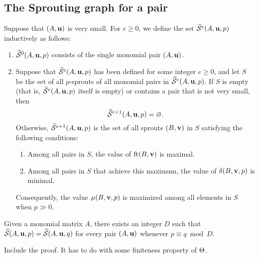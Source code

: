 \documentclass[11pt]{amsart}
\begin{document}
\subsection{The Sprouting graph for a pair}
\begin{definition}
   Suppose that $(A, \mathbf{u})$ is very small.
   For $e \geq 0$, we define the set $\widehat{\mathcal{S}}^e(A,\mathbf{u},p)$ inductively as follows:
\begin{enumerate}
\item $\widehat{\mathcal{S}}^0(A, \mathbf{u}, p)$ consists of the single monomial pair $(A, \mathbf{u})$.
\item Suppose that $\widehat{\mathcal{S}}^e(A, \mathbf{u}, p)$ has been defined for some integer $e \geq 0$, and let $S$ be the set of all $p$-sprouts of all monomial pairs in $\widehat{\mathcal{S}}^e(A, \mathbf{u}, p)$.
If  $S$ is empty (that is, $\widehat{\mathcal{S}}^e(A, \mathbf{u}, p)$ itself is empty) or contains a pair that is not very small, then \[ \widehat{\mathcal{S}}^{e+1}(A, \mathbf{u}, p) = \varnothing.\]  
Otherwise, $\widehat{\mathcal{S}}^{e+1}(A, \mathbf{u}, p)$ is the set of all sprouts $(B, \mathbf{v})$ in $S$ satisfying the following conditions:    

\begin{enumerate}
\item Among all pairs in $S$, the value of  $\operatorname{ft}(B, \mathbf{v})$ is maximal.
\item Among all pairs in $S$ that achieve this maximum, the value of $\delta(B, \mathbf{v}, p)$ is minimal.
\end{enumerate}
Consequently, the value $\mu(B, \mathbf{v},p)$ is maximized among all elements in $S$ when $p \gg 0$. 
\end{enumerate}
\end{definition}


\begin{proposition}
   Given a monomial matrix $A$, there exists an integer $D$ such that $\widehat{\mathcal{S}}(A, \mathbf{u}, p) = \widehat{\mathcal{S}}(A, \mathbf{u}, q)$ for every pair $(A, \mathbf{u})$ whenever $p \equiv q \bmod D$.
\end{proposition}

\alert[inline]{Include the proof.  It has to do with some finiteness property of $\Theta$.}


\end{document}
